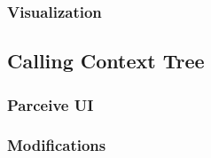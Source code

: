 \subsubsection{Visualization}

\subsection{Calling Context Tree}
\subsubsection{Parceive UI}
\subsubsection{Modifications}





